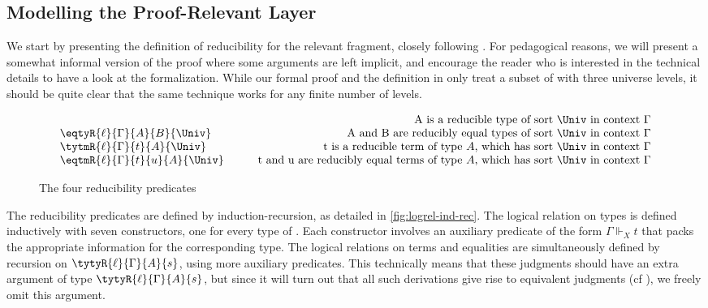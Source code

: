 \subsection{Modelling the Proof-Relevant Layer}

We start by presenting the definition of reducibility for the relevant
fragment, closely following .
%
For pedagogical reasons, we will present a somewhat informal version
of the proof where some arguments are left implicit, and encourage the reader 
who is interested in the technical details to have a look at the \Agda 
formalization.
%
While our formal proof and the definition in  only 
treat a subset of \SetoidCC with three universe levels, it should be quite 
clear that the same technique works for any finite number of levels.

\begin{figure*}
  \[
\begin{array}{lr}
   & \text{A is a reducible type of sort \( \Univ \) in context \( \Gamma \)} \\
  \eqtyR{\ell}{\Gamma}{A}{B}{\Univ} & \text{A and B are reducibly equal types of sort \( \Univ \) in context \( \Gamma \)} \\
  \tytmR{\ell}{\Gamma}{t}{A}{\Univ} & \text{t is a reducible term of type \( A \), which has sort \( \Univ \) in context \( \Gamma \)} \\
  \eqtmR{\ell}{\Gamma}{t}{u}{A}{\Univ} & \qquad\text{t and u are reducibly equal terms of type \( A \), which has sort \( \Univ \) in context \( \Gamma \)}
\end{array}
\]
\caption{The four reducibility predicates}
\label{fig:log-rel-judgments}
\end{figure*}

The reducibility predicates are defined by induction-recursion, as detailed
in \cref{fig:logrel-ind-rec}.
%
The logical relation on types is defined inductively with seven
constructors, one for every type of \SetoidCC. Each constructor
involves an auxiliary predicate of the form \( \Gamma \Vdash_X t \)
that packs the appropriate information for the corresponding type.
%
The logical relations on terms and equalities are simultaneously
defined by recursion on \( \tytyR{\ell}{\Gamma}{A}{s} \), using
more auxiliary predicates.
%
This technically means that these judgments should have an extra
argument of type \( \tytyR{\ell}{\Gamma}{A}{s} \), but since it
will turn out that all such derivations give rise to equivalent judgments
(cf ), we freely omit this argument.

